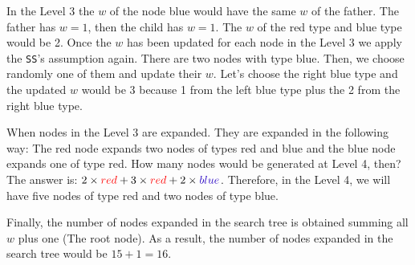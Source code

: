 In the Level 3 the $w$ of the node blue would have the same $w$ of the father. The father has $w = 1$, then the child has $w = 1$. The $w$ of the red type and blue type would be 2. Once the $w$ has been updated for each node in the Level 3 we apply the \texttt{SS}'s assumption again. There are two nodes with type blue. Then, we choose randomly one of them and update their $w$. Let's choose the right blue type and the updated $w$ would be 3 because 1 from the left blue type plus the 2 from the right blue type.

When nodes in the Level 3 are expanded. They are expanded in the following way: The red node expands two nodes of types red and blue and the blue node expands one of type red. How many nodes would be generated at Level 4, then? The answer is: $2 \times \textcolor{red}{red} + 3 \times \textcolor{red}{red} + 2 \times \textcolor{blue}{blue}$. Therefore, in the Level 4, we will have five nodes of type red and two nodes of type blue.

Finally, the number of nodes expanded in the search tree is obtained summing all $w$ plus one (The root node). As a result, the number of nodes expanded in the search tree would be $ 15 + 1 = 16$.

\clearpage
